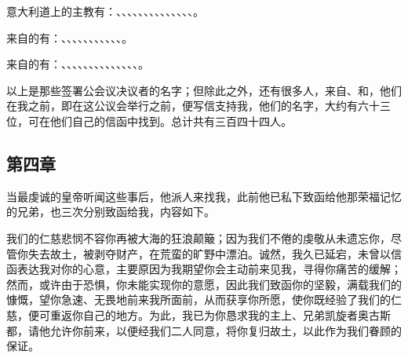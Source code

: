 意大利道上的主教有：、、、、、、、、、、、、、、。\par

来自的有：、、、、、、、、、、、。\par

来自的有：、、、、、、、、、、、、、、。\par

以上是那些签署公会议决议者的名字；但除此之外，还有很多人，来自、和，他们在我之前，即在这公议会举行之前，便写信支持我，他们的名字，大约有六十三位，可在他们自己的信函中找到。总计共有三百四十四人。\par


\subsection{第四章 }

当最虔诚的皇帝听闻这些事后，他派人来找我，此前他已私下致函给他那荣福记忆的兄弟，也三次分别致函给我，内容如下。\par

我们的仁慈悲悯不容你再被大海的狂浪颠簸；因为我们不倦的虔敬从未遗忘你，尽管你失去故土，被剥夺财产，在荒蛮的旷野中漂泊。诚然，我久已延宕，未曾以信函表达我对你的心意，主要原因为我期望你会主动前来见我，寻得你痛苦的缓解；然而，或许由于恐惧，你未能实现你的意愿，因此我们致函你的坚毅，满载我们的慷慨，望你急速、无畏地前来我所面前，从而获享你所愿，使你既经验了我们的仁慈，便可重返你自己的地方。为此，我已为你恳求我的主上、兄弟凯旋者奥古斯都，请他允许你前来，以便经我们二人同意，将你复归故土，以此作为我们眷顾的保证。\par

